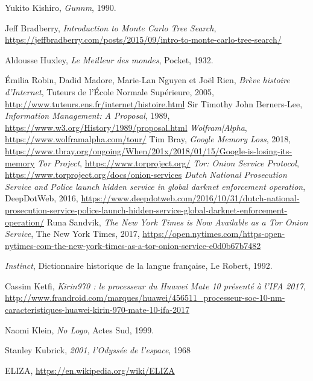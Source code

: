 \begin{thebibliography}{99}
     Yukito Kishiro, \emph{Gunnm}, 1990.

     Jeff Bradberry, \emph{Introduction to Monte Carlo Tree Search}, \url{https://jeffbradberry.com/posts/2015/09/intro-to-monte-carlo-tree-search/}

     Aldousse Huxley, \emph{Le Meilleur des mondes}, Pocket, 1932.

     Émilia Robin, Dadid Madore, Marie-Lan Nguyen et Joël Rien, \emph{Brève histoire d'Internet}, Tuteurs de l'École Normale Supérieure, 2005, \url{http://www.tuteurs.ens.fr/internet/histoire.html}
     Sir Timothy John Berners-Lee, \emph{Information Management: A Proposal}, 1989, \url{https://www.w3.org/History/1989/proposal.html}
     \emph{Wolfram|Alpha}, \url{https://www.wolframalpha.com/tour/}
     Tim Bray, \emph{Google Memory Loss}, 2018, \url{https://www.tbray.org/ongoing/When/201x/2018/01/15/Google-is-losing-its-memory}
     \emph{Tor Project}, \url{https://www.torproject.org/}
     \emph{Tor: Onion Service Protocol}, \url{https://www.torproject.org/docs/onion-services}
     \emph{Dutch National Prosecution Service and Police launch hidden service in global darknet enforcement operation}, DeepDotWeb, 2016, \url{https://www.deepdotweb.com/2016/10/31/dutch-national-prosecution-service-police-launch-hidden-service-global-darknet-enforcement-operation/}
     Runa Sandvik, \emph{The New York Times is Now Available as a Tor Onion Service}, The New York Times, 2017, \url{https://open.nytimes.com/https-open-nytimes-com-the-new-york-times-as-a-tor-onion-service-e0d0b67b7482}
    
     \emph{Instinct}, Dictionnaire historique de la langue française, Le Robert, 1992. 

     Cassim Ketfi, \emph{Kirin970 : le processeur du Huawei Mate 10 présenté à l'IFA 2017}, \url{http://www.frandroid.com/marques/huawei/456511_processeur-soc-10-nm-caracteristiques-huawei-kirin-970-mate-10-ifa-2017}

     Naomi Klein, \emph{No Logo}, Actes Sud, 1999.

     Stanley Kubrick, \emph{2001, l'Odyssée de l'espace}, 1968

     ELIZA, \url{https://en.wikipedia.org/wiki/ELIZA}


\end{thebibliography}
